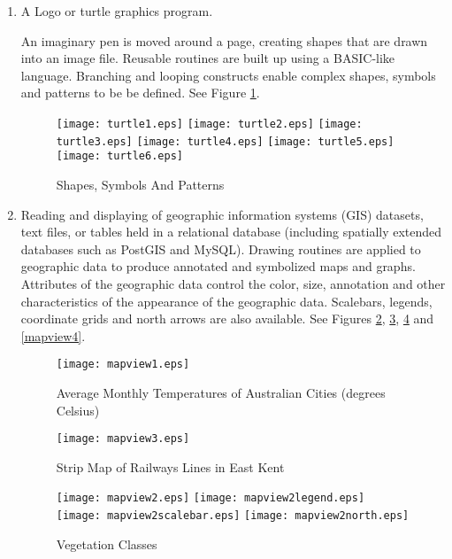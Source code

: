 \begin{enumerate}
\item

A Logo or turtle graphics program.

An imaginary pen is moved around a page,
creating shapes that are drawn into an image file.
Reusable routines are built up using a BASIC-like language.
Branching and looping constructs enable complex shapes, symbols and patterns
to be be defined.  See Figure \ref{turtle}.

\begin{figure}[htb]
\texttt{[image: turtle1.eps]}
\texttt{[image: turtle2.eps]}
\texttt{[image: turtle3.eps]}
\texttt{[image: turtle4.eps]}
\texttt{[image: turtle5.eps]}
\texttt{[image: turtle6.eps]}
\caption{Shapes, Symbols And Patterns}
\label{turtle}
\end{figure}

\item

Reading and displaying of geographic information
systems (GIS) datasets, text files, or tables held in a relational database
(including spatially extended databases such as PostGIS and MySQL).
Drawing routines are applied to geographic data to produce annotated and
symbolized maps and graphs.  Attributes of the geographic data control
the color, size, annotation and other characteristics of the
appearance of the geographic data.
Scalebars, legends, coordinate grids and north arrows are also available.
See Figures \ref{mapview1}, \ref{mapview3}, \ref{mapview2} and
\ref{mapview4}.

\begin{figure}
\texttt{[image: mapview1.eps]}
\caption[Average Monthly Temperatures]{Average Monthly Temperatures of Australian Cities (degrees Celsius)}
\label{mapview1}
\end{figure}

\begin{figure}
\texttt{[image: mapview3.eps]}
\caption{Strip Map of Railways Lines in East Kent}
\label{mapview3}
\end{figure}

\begin{figure}
\texttt{[image: mapview2.eps]}
\texttt{[image: mapview2legend.eps]}
\vspace{1pt}
\texttt{[image: mapview2scalebar.eps]}
\texttt{[image: mapview2north.eps]}
\caption{Vegetation Classes}
\label{mapview2}
\end{figure}


\end{enumerate}
